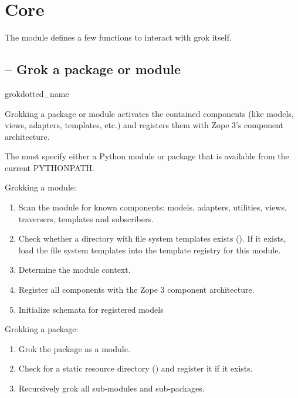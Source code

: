 \chapter{Core}

The  module defines a few functions to interact with grok itself.


\section{ -- Grok a package or module}

    \begin{funcdesc}{grok}{dotted_name}

    Grokking a package or module activates the contained components (like
    models, views, adapters, templates, etc.) and registers them with Zope 3's
    component architecture.

    The  must specify either a Python module or package
    that is available from the current PYTHONPATH.

    Grokking a module:

    \begin{enumerate}

        \item Scan the module for known components: models, adapters,
              utilities, views, traversers, templates and subscribers.

        \item Check whether a directory with file system templates
              exists ().  If it exists,
              load the file system templates into the template
              registry for this module.

        \item Determine the module context. 

        \item Register all components with the Zope 3 component architecture.

        \item Initialize schemata for registered models

    \end{enumerate}

    Grokking a package:

    \begin{enumerate}
        \item Grok the package as a module.

        \item Check for a static resource directory ()
          and register it if it exists.

        \item Recursively grok all sub-modules and sub-packages.

    \end{enumerate}

    \end{funcdesc}

